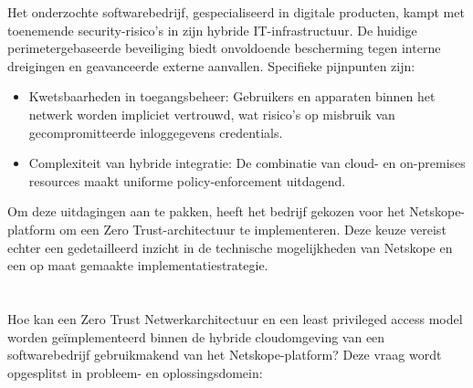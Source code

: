 
Het onderzochte softwarebedrijf, gespecialiseerd in digitale producten, kampt met toenemende security-risico’s in zijn hybride IT-infrastructuur. De huidige perimetergebaseerde beveiliging biedt onvoldoende bescherming tegen interne dreigingen en geavanceerde externe aanvallen. Specifieke pijnpunten zijn:

\begin{itemize}
  \item Kwetsbaarheden in toegangsbeheer: Gebruikers en apparaten binnen het netwerk worden impliciet vertrouwd, wat risico’s op misbruik van gecompromitteerde inloggegevens credentials.
	\item Complexiteit van hybride integratie: De combinatie van cloud- en on-premises resources maakt uniforme policy-enforcement uitdagend.
\end{itemize}

Om deze uitdagingen aan te pakken, heeft het bedrijf gekozen voor het Netskope-platform om een Zero Trust-architectuur te implementeren. Deze keuze vereist echter een gedetailleerd inzicht in de technische mogelijkheden van Netskope en een op maat gemaakte implementatiestrategie.

\section{}%
\label{sec:onderzoeksvraag}


Hoe kan een Zero Trust Netwerkarchitectuur en een least privileged access model worden geïmplementeerd binnen de hybride cloudomgeving van een softwarebedrijf gebruikmakend van het Netskope-platform?
Deze vraag wordt opgesplitst in probleem- en oplossingsdomein:

